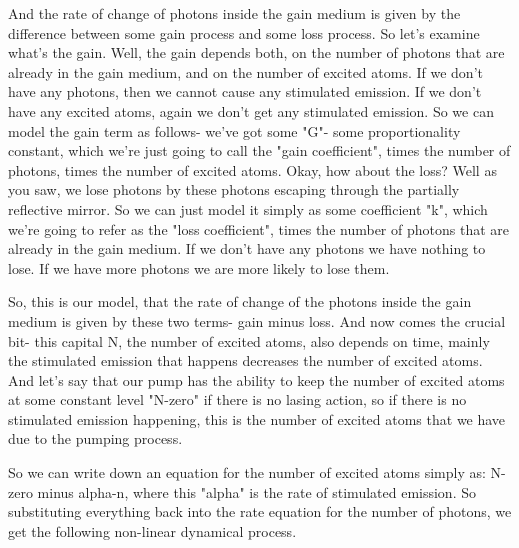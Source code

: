 And the rate of change of photons inside the gain medium is given by the difference between some gain process and some loss process. So let's examine what's the gain. Well, the gain depends both, on the number of photons that are already in the gain medium, and on the number of excited atoms. If we don't have any photons, then we cannot cause any stimulated emission. If we don't have any excited atoms, again we don't get any stimulated emission. So we can model the gain term as follows- we've got some "G"- some proportionality constant, which we're just going to call the "gain coefficient", times the number of photons, times the number of excited atoms. Okay, how about the loss? Well as you saw, we lose photons by these photons escaping through the partially reflective mirror. So we can just model it simply as some coefficient "k", which we're going to refer as the "loss coefficient", times the number of photons that are already in the gain medium. If we don't have any photons we have nothing to lose. If we have more photons we are more likely to lose them.

So, this is our model, that the rate of change of the photons inside the gain medium is given by these two terms- gain minus loss. And now comes the crucial bit- this capital N, the number of excited atoms, also depends on time, mainly the stimulated emission that happens decreases the number of excited atoms. And let's say that our pump has the ability to keep the number of excited atoms at some constant level "N-zero" if there is no lasing action, so if there is no stimulated emission happening, this is the number of excited atoms that we have due to the pumping process.

So we can write down an equation for the number of excited atoms simply as: N-zero minus alpha-n, where this "alpha" is the rate of stimulated emission. So substituting everything back into the rate equation for the number of photons, we get the following non-linear dynamical process.

